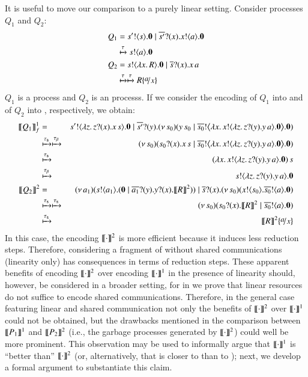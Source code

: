 \documentclass[preprint,11pt]{elsarticle}
\begin{document}
{It is useful to move our comparison 
to a purely linear setting. %
Consider processes $Q_1$ and $Q_2$:
\begin{align*}
	Q_1  & =  \bout{s'}{s} \inact \Par \binp{\dual{s'}}{x} \bout{x}{a} \inact
	\\
	& \hby{\tau}
	\bout{s}{a} \inact 
	\\
	Q_2 & =  \bout{s}{\abs{x}{R}} \inact \Par \binp{\dual{s}}{x} \appl{x}{a}
	\\
	& \hby{\tau}
	\hby{\tau}
	R \subst{a}{x}
\end{align*}
$Q_1$ is a \sessp process and $Q_2$ is an \HO processs.
If we consider the encoding of $Q_1$ into \HO and of $Q_2$ into \sessp, respectively, 
we obtain:
\begin{eqnarray*}
	\map{Q_1}_f^{1} & = & \bout{s'}{\abs{z}{\binp{z}{x} \appl{x}{s}}} \inact \Par 
	\binp{\dual{s'}}{y} \newsp{s_0}{\appl{y}{s_0} \Par \bbout{\dual{s_0}}{\abs{x}{\bout{x}{\abs{z}{\binp{z}{y} \appl{y}{a}}} \inact}} \inact}\\
	& \hby{\stau} \hby{\btau}& 
	\newsp{s_0}{\binp{s_0}{x} \appl{x}{s} \Par \bbout{\dual{s_0}}{\abs{x}{\bout{x}{\abs{z}{\binp{z}{y} \appl{y}{a}}} \inact}} \inact}\\
	& \hby{\stau} & 
	\appl{(\abs{x}{\bout{x}{\abs{z}{\binp{z}{y} \appl{y}{a}}} \inact})}{s}
	\\
	& \hby{\btau} & 
	\bout{s}{\abs{z}{\binp{z}{y} \appl{y}{a}}} \inact \\
	\pmap{Q_2}{2} & = & \newsp{a_1}{\bout{s}{a_1} (\inact \Par \binp{\dual{a_1}}{y} \binp{y}{x} \pmap{R}{2})} \Par \binp{\dual{s}}{x} \newsp{s_0}{\bout{x}{s_0} \bout{\dual{s_0}}{a} \inact}
	\\
	& \hby{\stau} \hby{\stau} & 
	\newsp{s_0}{\binp{s_0}{x} \pmap{R}{2} \Par \bout{\dual{s_0}}{a} \inact}
	\\
	& \hby{\stau} &
	\pmap{R}{2}\subst{a}{x}
\end{eqnarray*}
In this case, the encoding $\llbracket\cdot\rrbracket^2$ is more efficient because it induces less reduction steps.
Therefore, considering a fragment of \HOp without shared communications (linearity only)
has consequences in terms of reduction steps. 
These apparent benefits of encoding  $\llbracket\cdot\rrbracket^2$ over 
encoding  $\llbracket\cdot\rrbracket^1$ in the presence of linearity should, however, be considered in a broader setting, for 
in  we prove that linear resources do 
not suffice to encode shared communications.
Therefore, in the general case featuring linear and shared communication not only the benefits of  $\llbracket\cdot\rrbracket^2$ over  $\llbracket\cdot\rrbracket^1$ could not be obtained,
but the drawbacks mentioned in the comparison between $\llbracket P_1\rrbracket^1$ and $\llbracket P_2\rrbracket^2$ (i.e., the garbage processes 
generated by $\llbracket\cdot\rrbracket^2$) 
could well be more prominent. This observation may be used to informally argue that $\llbracket\cdot\rrbracket^1$ is ``better than'' $\llbracket\cdot\rrbracket^2$ (or, alternatively, that \HOp is closer to \HO than to \sessp);
next, we develop a formal argument to substantiate this claim.

}
\end{document}
